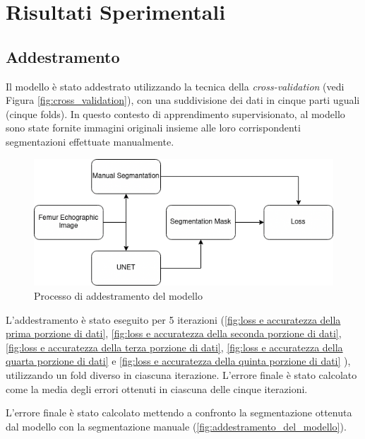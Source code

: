 \chapter{Risultati Sperimentali}
\label{chap:Risultati sperimentali}

\section{Addestramento}
\label{sec:Addestramento}

Il modello è stato addestrato utilizzando la tecnica della \textit{cross-validation} (vedi Figura
\ref{fig:cross_validation}), con una suddivisione dei dati in cinque parti uguali (cinque folds). In
questo contesto di apprendimento supervisionato, al modello sono state fornite immagini originali
insieme alle loro corrispondenti segmentazioni effettuate manualmente.

\begin{figure}[!ht]
	\centering
	\includegraphics[width=0.7\columnwidth]{Immagini/training.png}
	\caption{Processo di addestramento del modello}
	\label{fig:addestramento_del_modello}
\end{figure}

L'addestramento è stato eseguito per 5 iterazioni (\autoref{fig:loss e accuratezza della prima porzione di dati},
\autoref{fig:loss e accuratezza della seconda porzione di dati}, \autoref{fig:loss e accuratezza della terza porzione di dati},
\autoref{fig:loss e accuratezza della quarta porzione di dati} e \autoref{fig:loss e accuratezza della quinta porzione di dati}
), utilizzando un fold diverso in ciascuna
iterazione. L'errore finale è stato calcolato come la media degli errori ottenuti in ciascuna delle
cinque iterazioni.

L'errore finale è stato calcolato mettendo a confronto la segmentazione ottenuta dal modello con la
segmentazione manuale (\autoref{fig:addestramento_del_modello}).


